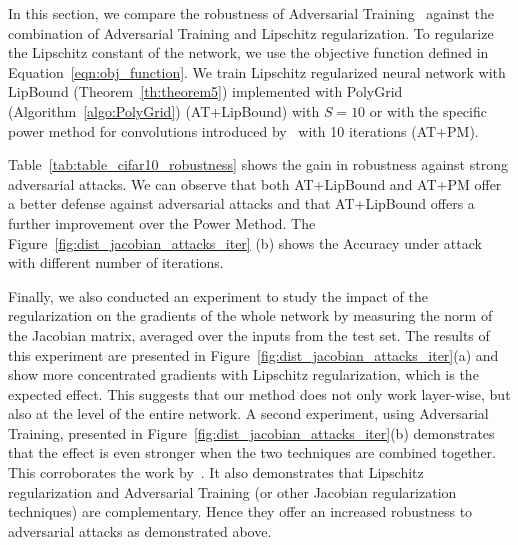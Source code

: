 In this section, we compare the robustness of Adversarial Training~\cite{goodfellow2014explaining, madry2018towards} against the combination of Adversarial Training and Lipschitz regularization.
To regularize the Lipschitz constant of the network, we use the objective function defined in Equation~\ref{eqn:obj_function}.
We train Lipschitz regularized neural network with LipBound (Theorem~\ref{th:theorem5}) implemented with PolyGrid (Algorithm~\ref{algo:PolyGrid}) (AT+LipBound) with $S = 10$ or with the specific power method for convolutions introduced by~\cite{farnia2018generalizable} with 10 iterations (AT+PM). 

Table~\ref{tab:table_cifar10_robustness} shows the gain in robustness against strong adversarial attacks.
We can observe that both AT+LipBound and AT+PM offer a better defense against adversarial attacks and that AT+LipBound offers a further improvement over the Power Method.
The Figure~\ref{fig:dist_jacobian_attacks_iter} (b) shows the Accuracy under attack with different number of iterations. 

Finally, we also conducted an experiment to study the impact of the regularization on the gradients of the whole network by measuring the norm of the Jacobian matrix, averaged over the inputs from the test set.
The results of this experiment are presented in Figure~\ref{fig:dist_jacobian_attacks_iter}(a) and show more concentrated gradients with  Lipschitz regularization, which is the expected effect.
This suggests that our method does not only work layer-wise, but also at the level of the entire network.
A second experiment, using Adversarial Training, presented in Figure~\ref{fig:dist_jacobian_attacks_iter}(b) demonstrates that the effect is even stronger when the two techniques are combined together.
This corroborates the work by~\cite{farnia2018generalizable}.
It also demonstrates that Lipschitz regularization and Adversarial Training (or other Jacobian regularization techniques) are complementary.
Hence they offer an increased robustness to adversarial attacks as demonstrated above.


